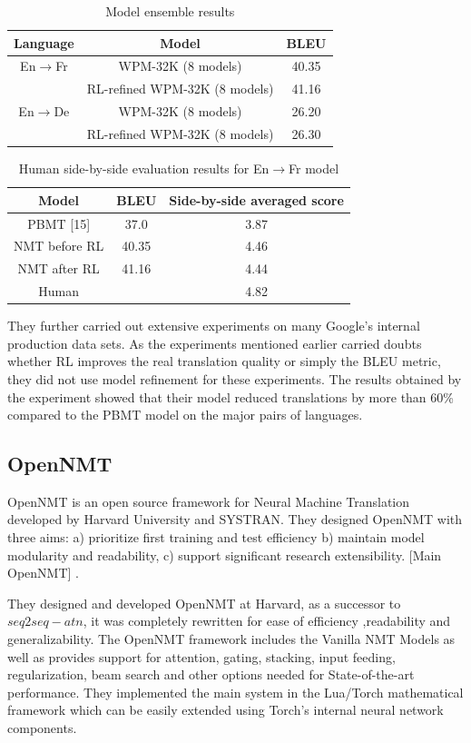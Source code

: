 \begin{table}[h!]
\centering
 \begin{tabular}{ |ccc| } 
  \hline Language & Model &  BLEU \\ 
  \hline  En$\rightarrow$Fr &   WPM-32K (8 models) & 40.35\\
  &RL-refined WPM-32K (8 models)& 41.16\\
  \hline
  En$\rightarrow$De &  WPM-32K (8 models) &  26.20\\
  &RL-refined WPM-32K (8 models)&26.30\\
  \hline
 \end{tabular}
\caption{Model ensemble results}
\end{table}




\begin{table}[h!]
\centering
 \begin{tabular}{ |ccc| } 
  \hline Model &  BLEU & Side-by-side
averaged score \\ 
  \hline PBMT [15]  &   37.0 & 3.87\\
  NMT before RL& 40.35&4.46\\
  NMT after RL&41.16& 4.44\\
  \hline
  Human &   &  4.82\\
  \hline
 \end{tabular}
\caption{Human side-by-side evaluation results for En$\rightarrow$Fr model}
\end{table}
They further carried out extensive experiments on many Google’s internal production data sets. As the experiments mentioned earlier carried doubts whether RL improves the real translation quality or simply the BLEU metric, they did not use model refinement for these experiments. The results obtained by the experiment showed that their model reduced translations by more than 60\% compared to the PBMT model on the major pairs of languages.


\subsection{OpenNMT}
OpenNMT is an open source framework for Neural Machine Translation developed by Harvard University and SYSTRAN. They designed OpenNMT with three aims: a) prioritize first training and test efficiency b) maintain model modularity and readability, c) support significant research extensibility. [Main OpenNMT] . 

They designed and developed  OpenNMT at Harvard, as a successor to $seq2seq-atn$, it was completely rewritten for ease of efficiency ,readability and generalizability. The OpenNMT framework includes the Vanilla NMT Models as well as provides support for attention, gating, stacking, input feeding, regularization, beam search and other options needed for State-of-the-art performance. They implemented the main system in the Lua/Torch mathematical framework which can be easily extended using Torch's internal neural network components. 


